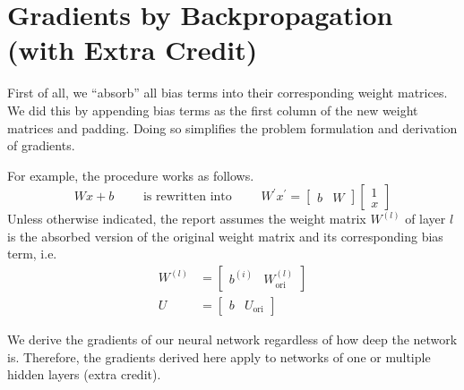 \documentclass[letterpaper]{article}
\begin{document}
 
\section{Gradients by Backpropagation (with Extra Credit)}\label{sec:grad}
First of all, we ``absorb'' all bias terms into their corresponding weight matrices.  We did this by appending bias terms as the first column of the new weight matrices and padding. Doing so simplifies the problem formulation and derivation of gradients.

For example, the procedure works as follows.
\begin{equation}
W x + b
\qquad
\textrm{ is rewritten into }
\qquad
W^\prime
x^\prime
=
\begin{bmatrix}
b & W
\end{bmatrix}
\begin{bmatrix}
1 \\ x
\end{bmatrix}
\end{equation}
Unless otherwise indicated, the report assumes the weight matrix $W^{(l)}$ of layer $l$ is the absorbed version of the original weight matrix and its corresponding bias term, i.e.
\begin{equation}
\begin{split}
W^{(l)} & =
\begin{bmatrix}
b^{(i)} & W^{(l)}_\textrm{ori}
\end{bmatrix} \\
U &=
\begin{bmatrix}
b & U_\textrm{ori}
\end{bmatrix}
\end{split}
\end{equation}


We derive the gradients of our neural network regardless
of how deep the network is. Therefore, the gradients derived here apply to networks of one or multiple hidden layers (extra credit).

\vspace{0.1cm}
\end{document}
